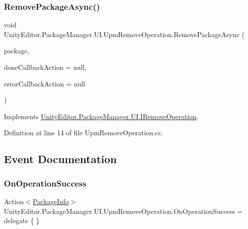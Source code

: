 \subsubsection{\texorpdfstring{RemovePackageAsync()}{RemovePackageAsync()}}
{\footnotesize\ttfamily void Unity\+Editor.\+Package\+Manager.\+U\+I.\+Upm\+Remove\+Operation.\+Remove\+Package\+Async (\begin{DoxyParamCaption}\item[{\mbox{\hyperlink{class_unity_editor_1_1_package_manager_1_1_u_i_1_1_package_info}{Package\+Info}}}]{package,  }\item[{Action$<$ \mbox{\hyperlink{class_unity_editor_1_1_package_manager_1_1_u_i_1_1_package_info}{Package\+Info}} $>$}]{done\+Callback\+Action = {\ttfamily null},  }\item[{Action$<$ \mbox{\hyperlink{class_unity_editor_1_1_package_manager_1_1_u_i_1_1_upm_base_operation_a116dcc466d587905084e826b47f7e05b}{Error}} $>$}]{error\+Callback\+Action = {\ttfamily null} }\end{DoxyParamCaption})}



Implements \mbox{\hyperlink{interface_unity_editor_1_1_package_manager_1_1_u_i_1_1_i_remove_operation_a83f4739b21051b92ceb18336953a6af1}{Unity\+Editor.\+Package\+Manager.\+U\+I.\+I\+Remove\+Operation}}.



Definition at line 14 of file Upm\+Remove\+Operation.\+cs.



\subsection{Event Documentation}
\mbox{\label{class_unity_editor_1_1_package_manager_1_1_u_i_1_1_upm_remove_operation_ad7753407c1cd02f6759b0c72ee15b0a9}} 
\subsubsection{\texorpdfstring{OnOperationSuccess}{OnOperationSuccess}}
{\footnotesize\ttfamily Action$<$\mbox{\hyperlink{class_unity_editor_1_1_package_manager_1_1_u_i_1_1_package_info}{Package\+Info}}$>$ Unity\+Editor.\+Package\+Manager.\+U\+I.\+Upm\+Remove\+Operation.\+On\+Operation\+Success = delegate \{ \}}



